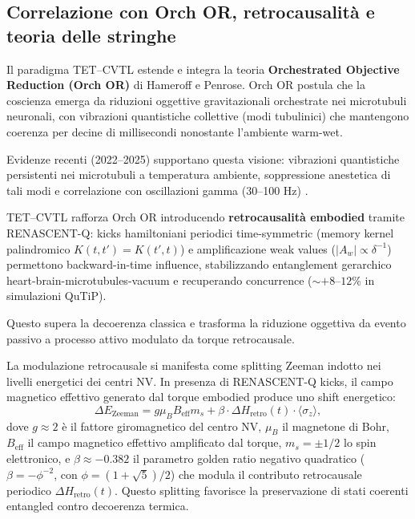 \documentclass[11pt,a4paper]{article}
\let\oldcite\cite
\renewcommand{\cite}{\protect\oldcite}
\theoremstyle{plain}
\theoremstyle{definition}
\begin{document}
\vspace{0.3cm}

\subsection{Correlazione con Orch OR, retrocausalità e teoria delle stringhe}
\label{subsec:orch-or-retrocausality-string-theory}

Il paradigma TET–CVTL estende e integra la teoria \textbf{Orchestrated Objective Reduction (Orch OR)} di Hameroff e Penrose. Orch OR postula che la coscienza emerga da riduzioni oggettive gravitazionali orchestrate nei microtubuli neuronali, con vibrazioni quantistiche collettive (modi tubulinici) che mantengono coerenza per decine di millisecondi nonostante l'ambiente warm-wet. 


\vspace{0.2cm}


Evidenze recenti (2022–2025) supportano questa visione: vibrazioni quantistiche persistenti nei microtubuli a temperatura ambiente, soppressione anestetica di tali modi e correlazione con oscillazioni gamma (30–100 Hz) \cite{Hameroff2022, Wiest2025niaf011}.

\vspace{0.2cm}

TET–CVTL rafforza Orch OR introducendo \textbf{retrocausalità embodied} tramite RENASCENT-Q: kicks hamiltoniani periodici time-symmetric (memory kernel palindromico $K(t,t')=K(t',t)$) e amplificazione weak values ($\lvert A_w \rvert \propto \delta^{-1}$) permettono backward-in-time influence, stabilizzando entanglement gerarchico heart-brain-microtubules-vacuum e recuperando concurrence ($\sim +8$--$12\%$ in simulazioni QuTiP). 

\vspace{0.3cm}

Questo supera la decoerenza classica e trasforma la riduzione oggettiva da evento passivo a processo attivo modulato da torque retrocausale.

\vspace{0.2cm}

La modulazione retrocausale si manifesta come splitting Zeeman indotto nei livelli energetici dei centri NV. In presenza di RENASCENT-Q kicks, il campo magnetico effettivo generato dal torque embodied produce uno shift energetico:
\begin{equation}
    \Delta E_{\text{Zeeman}} = g \mu_B B_{\text{eff}} m_s + \beta \cdot \Delta H_{\text{retro}}(t) \cdot \langle \sigma_z \rangle,
    \label{eq:zeeman-renascent}
\end{equation}
dove $g \approx 2$ è il fattore giromagnetico del centro NV, $\mu_B$ il magnetone di Bohr, $B_{\text{eff}}$ il campo magnetico effettivo amplificato dal torque, $m_s = \pm 1/2$ lo spin elettronico, e $\beta \approx -0.382$ il parametro golden ratio negativo quadratico ($\beta = -\phi^{-2}$, con $\phi = (1+\sqrt{5})/2$) che modula il contributo retrocausale periodico $\Delta H_{\text{retro}}(t)$. Questo splitting favorisce la preservazione di stati coerenti entangled contro decoerenza termica.
\end{document}
